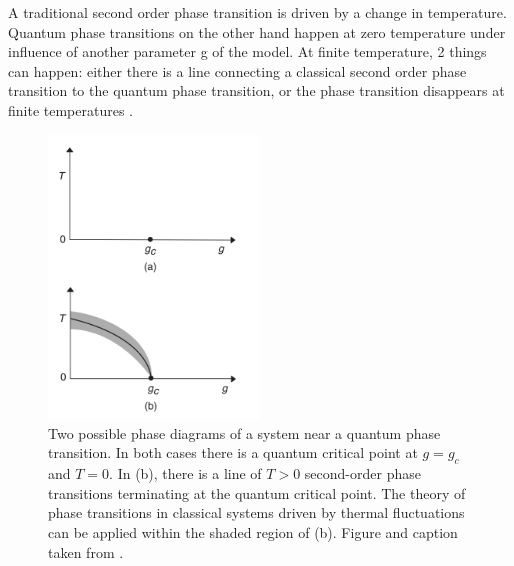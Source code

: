 A traditional second order phase transition is driven by a change in temperature. Quantum phase transitions on the other hand happen at zero temperature under influence of another parameter g of the model. At finite temperature, 2 things can happen: either there is a line connecting a classical second order phase transition to the quantum phase transition, or the phase transition disappears at finite temperatures \cite{Sachdev1999}.

\begin{figure}[h!]
    \center
    \includegraphics[width=0.5\textwidth]{Figuren/crit/Screenshot from 2021-05-06 15-58-55.png}
    \caption{ Two possible phase diagrams of a system near a quantum phase transition. In both cases there is a quantum critical point at $g = g_c$ and $T = 0$. In (b), there is a line of $T > 0$ second-order phase transitions terminating at the quantum critical point. The theory of phase transitions in classical systems driven by thermal fluctuations can be applied within the shaded region of (b).  Figure and caption taken from \cite{Sachdev1999}. }
    \label{fig:crit:qtran}
\end{figure}

